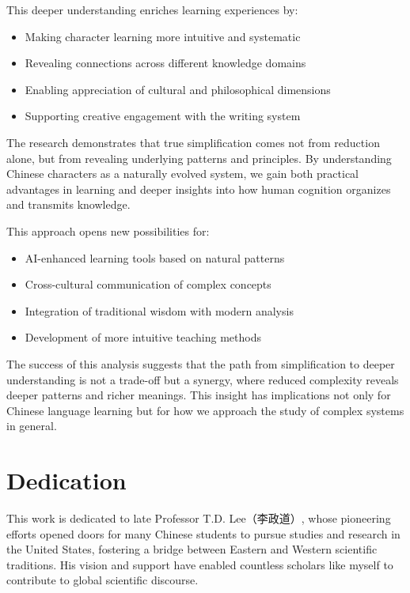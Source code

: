 \documentclass[11pt,letterpaper]{article}
\begin{document}
This deeper understanding enriches learning experiences by: 
\begin{itemize}[nosep,  %
    leftmargin=3em,  %
] 
\item   Making character learning more intuitive and systematic 
\item   Revealing connections across different knowledge domains 
\item   Enabling appreciation of cultural and philosophical dimensions 
\item   Supporting creative engagement with the writing system
\end{itemize}

The research demonstrates that true simplification comes not from
reduction alone, but from revealing underlying patterns and principles.
By understanding Chinese characters as a naturally evolved system, we
gain both practical advantages in learning and deeper insights into how
human cognition organizes and transmits knowledge. 

This approach opens new possibilities for: 

\begin{itemize}[nosep,  %
    leftmargin=3em,  %
] 
\item  AI-enhanced learning tools based on natural patterns 
\item  Cross-cultural communication of complex concepts 
\item  Integration of traditional wisdom with modern analysis 
\item  Development of more intuitive teaching methods
\end{itemize}

The success of this analysis suggests that the path from simplification
to deeper understanding is not a trade-off but a synergy, where reduced
complexity reveals deeper patterns and richer meanings. This insight has
implications not only for Chinese language learning but for how we
approach the study of complex systems in general.

\section{Dedication}\label{dedication}

This work is dedicated to late Professor T.D. Lee（李政道）, whose
pioneering efforts opened doors for many Chinese students to pursue
studies and research in the United States, fostering a bridge between
Eastern and Western scientific traditions. His vision and support have
enabled countless scholars like myself to contribute to global
scientific discourse.
\end{document}

